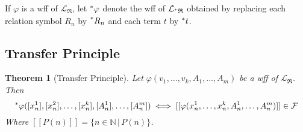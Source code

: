 \documentclass{article}
\newcommand{\nats}{\mathbb{N}}
\newcommand{\hr}[1]{\prescript{*}{}{#1}}
\newtheorem*{thm}{Theorem}
\begin{document}
If $\varphi$ is a wff of $\mathcal{L}_\mathfrak{R}$, let $\hr{\varphi}$ denote the wff of $\mathcal{L}_{\hr{\mathfrak{R}}}$ obtained by replacing each relation symbol $R_n$ by $\hr{R_n}$ and each term $t$ by $\hr{t}$.

\subsection{Transfer Principle}

\begin{thm}[Transfer Principle]
    Let $\varphi(v_1, \ldots, v_k, A_1, \ldots, A_m)$ be a wff of $\mathcal{L}_\mathfrak{R}$. Then 
    \[\hr\varphi([x^1_n], [x^2_n], \ldots, [x^k_n], [A^1_n], \ldots, [A^m_n]) \iff [[\varphi(x^1_n, \ldots, x^k_n, A^1_n, \ldots, A^m_n)]] \in \mathcal{F}\]
    Where $[[P(n)]] = \{n \in \nats \,|\, P(n)\}$.
\end{thm}
\end{document}
